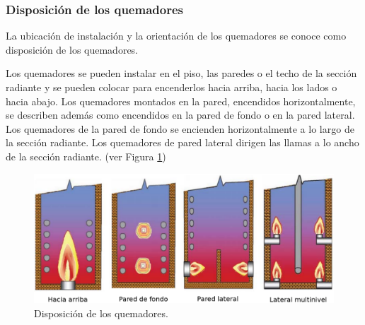 \subsubsection{Disposición de los quemadores}
\par La ubicación de instalación y la orientación de los quemadores se conoce como disposición de los quemadores.
\par Los quemadores se pueden instalar en el piso, las paredes o el techo de la sección radiante y se pueden colocar para encenderlos hacia arriba, hacia los lados o hacia abajo. Los quemadores montados en la pared, encendidos horizontalmente, se describen además como encendidos en la pared de fondo o en la pared lateral.\cite{kumar} Los quemadores de la pared de fondo se encienden horizontalmente a lo largo de la sección radiante. Los quemadores de pared lateral dirigen las llamas a lo ancho de la sección radiante. (ver Figura \ref{fig:quemadores})
\begin{figure}[hbt]
\begin{center}
\includegraphics[scale=0.30]{images/quemadores}
\caption[Disposición de los quemadores]{Disposición de los quemadores.\cite{kumar}}
\label{fig:quemadores}
\end{center}
\end{figure}

